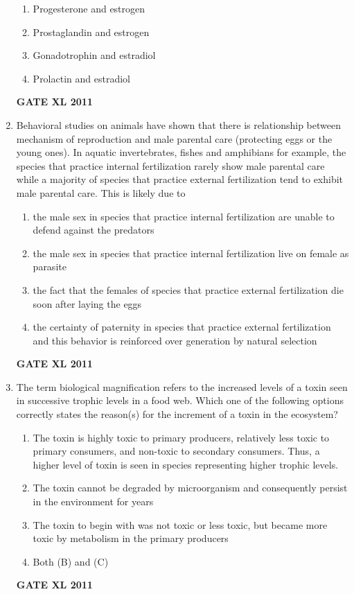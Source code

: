 \documentclass[journal,12pt,onecolumn]{IEEEtran}
\begin{document}
\begin{enumerate}
\begin{enumerate}
	\item Progesterone and estrogen
	\item Prostaglandin and estrogen
	\item Gonadotrophin and estradiol
	\item Prolactin and estradiol
\end{enumerate}
\hfill{\textbf{GATE XL 2011}}

\item {Behavioral studies on animals have shown that there is relationship between mechanism of reproduction and male parental care (protecting eggs or the young ones). In aquatic invertebrates, fishes and amphibians for example, the species that practice internal fertilization rarely show male parental care while a majority of species that practice external fertilization tend to exhibit male parental care. This is likely due to}

\begin{enumerate}
	\item the male sex in species that practice internal fertilization are unable to defend against the predators
	\item the male sex in species that practice internal fertilization live on female as parasite
	\item the fact that the females of species that practice external fertilization die soon after laying the eggs
	\item the certainty of paternity in species that practice external fertilization and this behavior is reinforced over generation by natural selection
\end{enumerate}
\hfill{\textbf{GATE XL 2011}}

\item{ The term biological magnification refers to the increased levels of a toxin seen in successive trophic levels in a food web. Which one of the following options correctly states the reason(s) for the increment of a toxin in the ecosystem?}
\begin{enumerate}
	\item The toxin is highly toxic to primary producers, relatively less toxic to primary consumers, and non-toxic to secondary consumers. Thus, a higher level of toxin is seen in species representing higher trophic levels.
	\item The toxin cannot be degraded by microorganism and consequently persist in the environment for years
	\item The toxin to begin with was not toxic or less toxic, but became more toxic by metabolism in the primary producers
	\item Both (B) and (C)
\end{enumerate}
\hfill{\textbf{GATE XL 2011}}


\end{enumerate}
\end{document}
